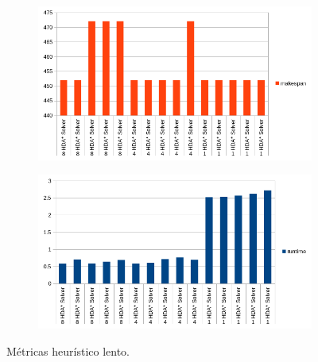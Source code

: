 \begin{figure}[h]
    \begin{subfigure}{.5\textwidth}
        \begin{center}
            \includegraphics[width=\textwidth]{Media/Ch2/Makespan_Slow_HDA.png}
        \end{center}
    \end{subfigure}
    \begin{subfigure}{.5\textwidth}
        \begin{center}
            \includegraphics[width=\textwidth]{Media/Ch2/Runtime_Slow_HDA.png}
        \end{center}
    \end{subfigure}
    \caption{Métricas heurístico lento.}
    \label{fig:HeuristicoLento}
\end{figure}

